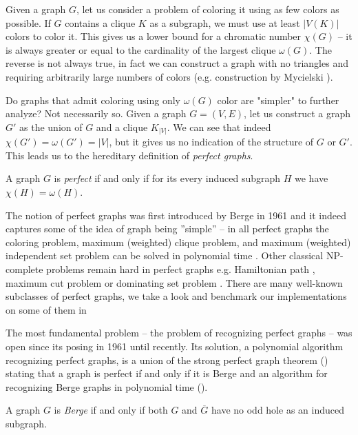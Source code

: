 Given a graph $G$, let us consider a problem of coloring it using as few colors as possible. If $G$ contains a clique $K$ as a subgraph, we must use at least $|V(K)|$ colors to color it. This gives us a lower bound for a chromatic number $\chi(G)$ -- it is always greater or equal to the cardinality of the largest clique $\omega(G)$. The reverse is not always true, in fact we can construct a graph with no triangles and requiring arbitrarily large numbers of colors (e.g. construction by Mycielski \cite{Mycielski1955}).

Do graphs that admit coloring using only $\omega(G)$ color are "simpler" to further analyze? Not necessarily so. Given a graph $G = (V, E)$, let us construct a graph $G'$ as the union of $G$ and a clique $K_{|V|}$. We can see that indeed $\chi(G') = \omega(G') = |V|$, but it gives us no indication of the structure of $G$ or $G'$. This leads us to the hereditary definition of \emph{perfect graphs}.

\begin{defn}
	\label{def:perfectGraph}
	A graph $G$ is \emph{perfect} if and only if for its every induced subgraph $H$ we have $\chi(H) = \omega(H)$.
\end{defn}

The notion of perfect graphs was first introduced by Berge in 1961 \cite{CB61} and it indeed captures some of the idea of graph being ''simple'' -- in all perfect graphs the coloring problem, maximum (weighted) clique problem, and maximum (weighted) independent set problem can be solved in polynomial time \cite{grotschel1993}. Other classical NP-complete problems remain hard in perfect graphs e.g. Hamiltonian path \cite{Mller1996}, maximum cut problem \cite{Bodlaender1994} or dominating set problem \cite{Dewdney81}. There are many well-known subclasses of perfect graphs, we take a look and benchmark our implementations on some of them in 

The most fundamental problem -- the problem of recognizing perfect graphs -- was open since its posing in 1961 until recently. Its solution, a polynomial algorithm recognizing perfect graphs, is a union of the strong perfect graph theorem () stating that a graph is perfect if and only if it is Berge and an algorithm for recognizing Berge graphs in polynomial time ().

\begin{defn}
	\label{def:bergeGraph}
	A graph $G$ is \emph{Berge} if and only if both $G$ and $\overline{G}$ have no odd hole as an induced subgraph.
\end{defn}

